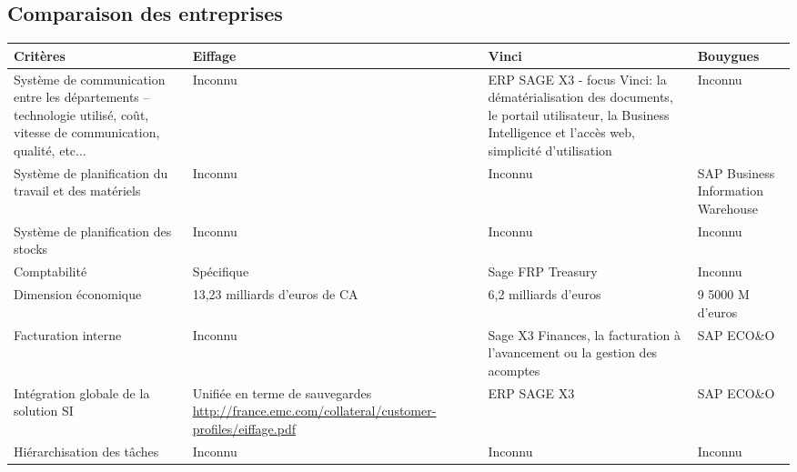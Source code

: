 \subsection{Comparaison des entreprises}

\begin{longtable}{|m{3cm}|m{4cm}|m{4cm}|m{4cm}|}
\hline
Critères&Eiffage&Vinci&Bouygues\\
\endhead
\hline
Système de communication entre les départements – technologie utilisé, 
coût, vitesse de communication, qualité, etc...
&
Inconnu
&
ERP SAGE X3 - focus Vinci: la dématérialisation des documents,
le portail utilisateur, la Business Intelligence et l’accès web,
simplicité d’utilisation
&
Inconnu
\\
\hline
Système de planification du travail et des matériels 
&
Inconnu
&
Inconnu
&
SAP Business Information Warehouse
\\
\hline
Système de planification des stocks
&
Inconnu
&
Inconnu
&
Inconnu
\\
\hline
Comptabilité
&
Spécifique
&
Sage FRP Treasury
&
Inconnu
\\
\hline
Dimension économique
&
13,23 milliards d'euros de CA
&
6,2 milliards d’euros
&
9 5000 M d'euros
\\
\hline
Facturation interne
&
Inconnu
&
Sage X3 Finances, la facturation à l’avancement ou la gestion des acomptes
&
SAP ECO\&O
\\
\hline
Intégration globale de la solution SI
&
Unifiée en terme de sauvegardes
\url{http://france.emc.com/collateral/customer-profiles/eiffage.pdf}
&
ERP SAGE X3
&
SAP ECO\&O
\\
\hline
Hiérarchisation des tâches
&
Inconnu
&
Inconnu
&
Inconnu
\\
\hline
\end{longtable}
